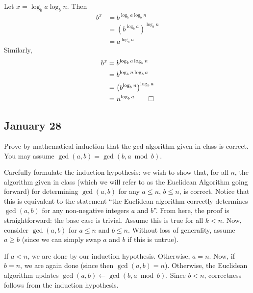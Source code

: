 \documentclass[draft]{article}
\begin{document}
\begin{solution}
    Let $x = \log_b{a}\log_b{n}$. Then
    \begin{align*}b^x
         & = b^{\log_b{a}\log_b{n}}                 \\
         & = \left(b^{\log_b{a}}\right)^{\log_b{n}} \\
         & = a^{\log_b{n}}
    \end{align*}
    Similarly,
    \begin{align*}b^x
         & = b^{\log_b{a}\log_b{n}}                 \\
         & = b^{\log_b{n}\log_b{a}}                 \\
         & = \left(b^{\log_b{n}}\right)^{\log_b{a}} \\
         & = n^{\log_b{a}}\qedhere
    \end{align*}
\end{solution}

\subsection{January 28}
\begin{question}
    Prove by mathematical induction that the gcd algorithm given in class is correct. You may assume $\gcd(a,b)=\gcd(b, a \bmod b)$.
\end{question}

\begin{solution}
    Carefully formulate the induction hypothesis: we wish to show that, for all $n$, the algorithm given in class (which we will refer to as the Euclidean Algorithm going forward) for determining $\gcd(a, b)$ for any $a\leq n$, $b\leq n$, is correct. Notice that this is equivalent to the statement ``the Euclidean algorithm correctly determines $\gcd(a, b)$ for any non-negative integers $a$ and $b$''. From here, the proof is straightforward: the base case is trivial. Assume this is true for all $k < n$. Now, consider $\gcd(a, b)$ for $a\leq n$ and $b\leq n$. Without loss of generality, assume $a \geq b$ (since we can simply swap $a$ and $b$ if this is untrue).

    If $a < n$, we are done by our induction hypothesis. Otherwise, $a = n$. Now, if $b = n$, we are again done (since then $\gcd(a, b) = n$). Otherwise, the Euclidean algorithm updates $\gcd(a, b) \gets \gcd(b, a \bmod b)$. Since $b < n$, correctness follows from the induction hypothesis.
\end{solution}
\end{document}
